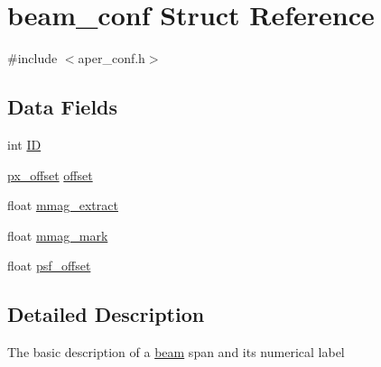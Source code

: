 \hypertarget{structbeam__conf}{
\section{beam\_\-conf Struct Reference}
\label{structbeam__conf}
}


{\ttfamily \#include $<$aper\_\-conf.h$>$}\subsection*{Data Fields}
\begin{DoxyCompactItemize}
\item 
int \hyperlink{structbeam__conf_a240d13d3f0a07ee411bce6c41b590b5b}{ID}
\item 
\hyperlink{structpx__offset}{px\_\-offset} \hyperlink{structbeam__conf_a55f5257b40a3f5f6b43980c779734e84}{offset}
\item 
float \hyperlink{structbeam__conf_adfafb08dec01127a7c09ec3dab7729b1}{mmag\_\-extract}
\item 
float \hyperlink{structbeam__conf_a2d2357691589e58e4e50eb9fe9bbf199}{mmag\_\-mark}
\item 
float \hyperlink{structbeam__conf_a4ef1405baadd6ba9013e444a2001ed60}{psf\_\-offset}
\end{DoxyCompactItemize}


\subsection{Detailed Description}
The basic description of a \hyperlink{structbeam}{beam} span and its numerical label 

